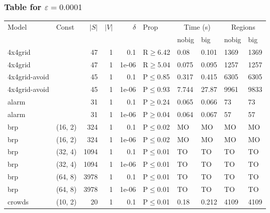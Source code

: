 \subsubsection{Table for \(\varepsilon=0.0001\)}
\begin{longtable}{llrrrlllll}

        \toprule
        Model & Const & $|S|$ & $|V|$ & $\delta$ & Prop & \multicolumn{2}{c}{Time (s)} & \multicolumn{2}{c}{Regions} \\
        \cmidrule(ll){7-8} \cmidrule(ll){9-10}
        & & & & & & nobig & big & nobig & big \\
        \midrule
        
 4x4grid       &           &     	47 & 1 & 0.1   & R$\geq$6.42  & 0.08    & 0.101    & 1369   & 1369    \\
 4x4grid       &           &     	47 & 1 & 1e-06 & R$\geq$5.04  & 0.075   & 0.095    & 1257   & 1257    \\
 4x4grid-avoid &           &     	45 & 1 & 0.1   & P$\leq$0.85  & 0.317   & 0.415    & 6305   & 6305    \\
 4x4grid-avoid &           &     	45 & 1 & 1e-06 & P$\leq$0.93  & 7.744   & 27.87    & 9961   & 9833    \\
 alarm         &           &     	31 & 1 & 0.1   & P$\geq$0.24  & 0.065   & 0.066    & 73     & 73      \\
 alarm         &           &     	31 & 1 & 1e-06 & P$\geq$0.04  & 0.064   & 0.067    & 57     & 57      \\
 brp           & (16, 2)   &    	324 & 1 & 0.1   & P$\leq$0.02  & MO      & MO       & MO     & MO      \\
 brp           & (16, 2)   &    	324 & 1 & 1e-06 & P$\leq$0.02  & MO      & MO       & MO     & MO      \\
 brp           & (32, 4)   &   	1094 & 1 & 0.1   & P$\leq$0.01  & TO      & TO       & TO     & TO      \\
 brp           & (32, 4)   &   	1094 & 1 & 1e-06 & P$\leq$0.01  & TO      & TO       & TO     & TO      \\
 brp           & (64, 8)   &   	3978 & 1 & 0.1   & P$\leq$0.01  & TO      & TO       & TO     & TO      \\
 brp           & (64, 8)   &   	3978 & 1 & 1e-06 & P$\leq$0.01  & TO      & TO       & TO     & TO      \\
 crowds        & (10, 2)   &     	20 & 1 & 0.1   & P$\leq$0.01  & 0.18    & 0.212    & 4109   & 4109    \\

\end{longtable}
